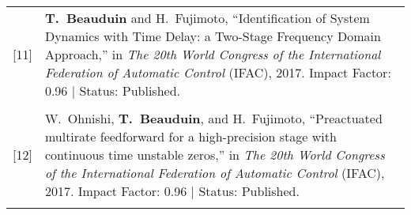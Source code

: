 \documentclass[a4paper,10pt]{article}
\begin{document}
\begin{tabularx}{\textwidth}{cX}
[11] & \textbf{T.~Beauduin} and H.~Fujimoto, ``{Identification of System Dynamics with Time Delay: 
	a Two-Stage Frequency Domain Approach},'' in \emph{The 20th World Congress of the 
	International Federation of Automatic Control} (IFAC), 2017.
	Impact Factor: 0.96 | Status: Published. \\
	& \\

[12] & W.~Ohnishi, \textbf{T.~Beauduin}, and H.~Fujimoto, ``{Preactuated multirate feedforward
	for a high-precision stage with continuous time unstable zeros},'' in
	\emph{The 20th World Congress of the International Federation of Automatic Control} (IFAC), 2017.
	Impact Factor: 0.96 | Status: Published. \\
	& \\


\end{tabularx}

%
\end{document}
